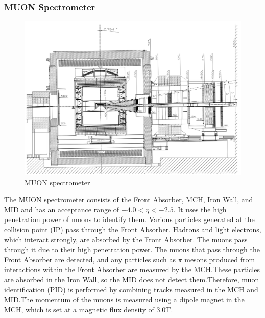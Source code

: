         \subsubsection{MUON Spectrometer}
            \begin{figure}
                \centering
                \includegraphics[keepaspectratio, scale=0.25]{fig/2_2_MUONspectrometer.png}
                \caption{MUON spectrometer}
            \end{figure}
            The MUON spectrometer consists of the Front Absorber, MCH, Iron Wall, and MID and has an acceptance range of $-4.0 < \eta < -2.5$. It uses the high penetration power of muons to identify them. Various particles generated at the collision point (IP) pass through the Front Absorber. Hadrons and light electrons, which interact strongly, are absorbed by the Front Absorber. The muons pass through it due to their high penetration power. The muons that pass through the Front Absorber are detected, and any particles such as $\pi$ mesons produced from interactions within the Front Absorber are measured by the MCH.\@ These particles are absorbed in the Iron Wall, so the MID does not detect them.\@ Therefore, muon identification (PID) is performed by combining tracks measured in the MCH and MID.\@ The momentum of the muons is measured using a dipole magnet in the MCH, which is set at a magnetic flux density of 3.0T.\@

